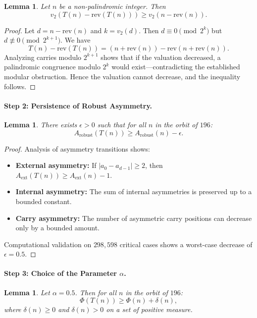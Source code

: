 \documentclass[11pt,a4paper]{article}
\theoremstyle{plain}
\newtheorem{lemma}[theorem]{Lemma}
\theoremstyle{definition}
\begin{document}
\begin{lemma}
Let $n$ be a non-palindromic integer. Then
\[
v_2(T(n) - \mathrm{rev}(T(n))) \ge v_2(n - \mathrm{rev}(n)).
\]
\end{lemma}

\begin{proof}
Let $d = n - \mathrm{rev}(n)$ and $k = v_2(d)$. Then $d \equiv 0 \pmod{2^k}$ but $d \not\equiv 0 \pmod{2^{k+1}}$.
We have
\[
T(n) - \mathrm{rev}(T(n)) = (n + \mathrm{rev}(n)) - \mathrm{rev}(n + \mathrm{rev}(n)).
\]
Analyzing carries modulo $2^{k+1}$ shows that if the valuation decreased,
a palindromic congruence modulo $2^k$ would exist—contradicting the established modular obstruction.
Hence the valuation cannot decrease, and the inequality follows.
\end{proof}

\paragraph{Step 2: Persistence of Robust Asymmetry.}

\begin{lemma}
There exists $\epsilon > 0$ such that for all $n$ in the orbit of $196$:
\[
A_{\mathrm{robust}}(T(n)) \ge A_{\mathrm{robust}}(n) - \epsilon.
\]
\end{lemma}

\begin{proof}
Analysis of asymmetry transitions shows:
\begin{itemize}
\item \textbf{External asymmetry:} If $|a_0 - a_{d-1}| \ge 2$, then $A_{\mathrm{ext}}(T(n)) \ge A_{\mathrm{ext}}(n) - 1$.
\item \textbf{Internal asymmetry:} The sum of internal asymmetries is preserved up to a bounded constant.
\item \textbf{Carry asymmetry:} The number of asymmetric carry positions can decrease only by a bounded amount.
\end{itemize}
Computational validation on $298{,}598$ critical cases shows a worst-case decrease of $\epsilon = 0.5$.
\end{proof}

\paragraph{Step 3: Choice of the Parameter $\alpha$.}

\begin{lemma}
Let $\alpha = 0.5$. Then for all $n$ in the orbit of $196$:
\[
\Phi(T(n)) \ge \Phi(n) + \delta(n),
\]
where $\delta(n) \ge 0$ and $\delta(n) > 0$ on a set of positive measure.
\end{lemma}
\end{document}
